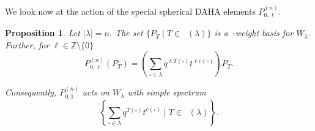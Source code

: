 \documentclass[pdftex]{sigma}
\numberwithin{equation}{section}
\newtheorem{Proposition}[Theorem]{Proposition}
\theoremstyle{definition}
\DeclareMathOperator{\RSSYT}{\mathrm{RSSYT}_{\geq 0}}
\begin{document}
We look now at the action of the special spherical DAHA elements $P_{0,\ell}^{(n)}$.

\begin{Proposition}\label{finite rank gen macd function properties}
 Let $|\lambda| = n$. The set $\{P_T\mid T \in \RSSYT(\lambda)\}$ is a~-weight basis for $W_{\lambda}$. Further, for $\ell \in \mathbb{Z}\setminus\{0\}$
 \[
 P_{0,\ell}^{(n)}(P_T) = \left( \sum_{\square \in \lambda} q^{\ell T(\square)}t^{\ell c(\square)} \right) P_T.
 \]

 Consequently, $P_{0,1}^{(n)}$ acts on $W_{\lambda}$ with simple spectrum
 \[
 \left\{ \sum_{\square \in \lambda} q^{T(\square)}t^{c(\square)} \mid T \in \RSSYT(\lambda) \right\}.
 \]

\end{Proposition}
\end{document}
